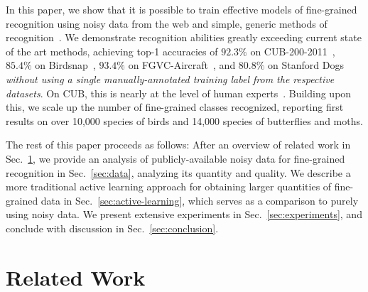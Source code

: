 \documentclass[runningheads]{llncs}
\begin{document}
In this paper, we show that it is possible to train effective models of fine-grained recognition using noisy data from the web and simple, generic methods of recognition~\cite{szegedy2015rethinking,szegedy2014going}.
We demonstrate recognition abilities greatly exceeding current state of the art methods, achieving top-1 accuracies of $92.3\%$ on CUB-200-2011~\cite{wahcub2002011}, $85.4\%$ on Birdsnap~\cite{bergbirdsnapcvpr2014}, $93.4\%$ on FGVC-Aircraft~\cite{maji13finegrained}, and $80.8\%$ on Stanford Dogs~\cite{khosla2011novel} \emph{without using a single manually-annotated training label from the respective datasets}.
On CUB, this is nearly at the level of human experts~\cite{branson2014ignorant,horn2015}.
Building upon this, we scale up the number of fine-grained classes recognized, reporting first results on over 10,000 species of birds and 14,000 species of butterflies and moths.

The rest of this paper proceeds as follows:
After an overview of related work in Sec.~\ref{sec:related}, we provide an analysis of publicly-available noisy data for fine-grained recognition in Sec.~\ref{sec:data}, analyzing its quantity and quality.
We describe a more traditional active learning approach for obtaining larger quantities of fine-grained data in Sec.~\ref{sec:active-learning}, which serves as a comparison to purely using noisy data.
We present extensive experiments in Sec.~\ref{sec:experiments}, and conclude with discussion in Sec.~\ref{sec:conclusion}.


\section{Related Work}
\label{sec:related}
\end{document}
